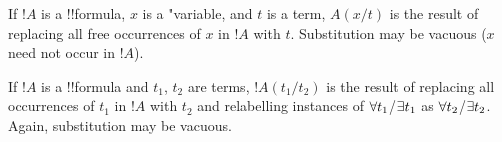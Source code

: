 \documentclass[../../include/open-logic-section]{subfiles}
\begin{document}



\begin{defn}
If $!A$ is a !!{formula}, $x$ is a "{variable}, and $t$ is a term, $A(x/t)$
is the result of replacing all free occurrences of $x$ in $!A$ with
$t$. Substitution may be vacuous ($x$ need not occur in $!A$).
\end{defn}

\begin{defn}
If $!A$ is a !!{formula} and $t_1$, $t_2$ are terms, $!A(t_1/t_2)$ is
the result of replacing all occurrences of $t_1$ in $!A$ with $t_2$
and relabelling instances of $\lforall[t_1]$/$\lexists[t_1]$ as
$\lforall[t_2]$/$\lexists[t_2]$. Again, substitution may be vacuous.
\end{defn}
\end{document}
